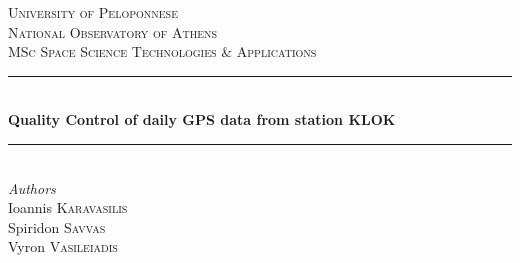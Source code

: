 \documentclass[
12pt, %
a4paper, %
oneside, %
headinclude,footinclude, %
BCOR5mm, %
]{article}
\begin{document}



\begin{titlepage}

\newcommand{\HRule}{\rule{\linewidth}{0.5mm}} %

\center %
 

\textsc{\LARGE University of Peloponnese}\\[0.5cm] %
\textsc{\Large National Observatory of Athens}\\[0.5cm] %
\textsc{\large MSc Space Science Technologies \& Applications}\\[1cm] %


\HRule \\[0.5cm]
{ \huge \bfseries Quality Control of daily GPS data from station KLOK}\\[0.2cm] %
\HRule \\[1.5cm]
 

\Large \emph{Authors}\\
Ioannis \textsc{Karavasilis}\\
Spiridon \textsc{Savvas}\\
Vyron \textsc{Vasileiadis}\\[3cm] %



\end{titlepage}
\end{document}
